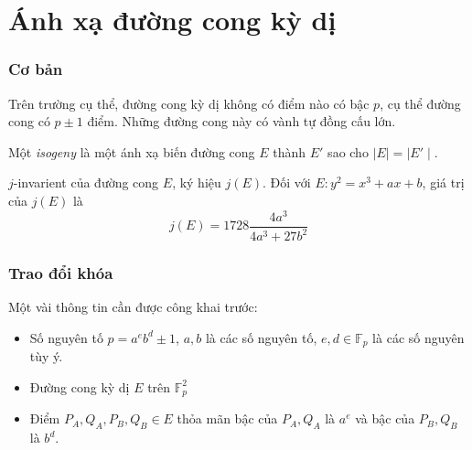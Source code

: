 \documentclass [xcolor=svgnames, t] {beamer}
\theoremstyle{definition}
\begin{document}
\section{Ánh xạ đường cong kỳ dị}

\begin{frame}
    \frametitle{Cơ bản}
    \begin{definition}
        Trên trường cụ thể, đường cong kỳ dị không có điểm nào có bậc $p$, cụ thể đường cong có $p \pm 1$ điểm. Những đường cong này có vành tự đồng cấu lớn.
    \end{definition}
    \begin{definition}
        Một \textit{isogeny} là một ánh xạ biến đường cong $E$ thành $E'$ sao cho $\mid E \mid = \mid E' \mid$.
    \end{definition}
    \begin{definition}
        $j$-invarient của đường cong $E$, ký hiệu $j(E)$. Đối với $E: y^2 = x^3 + ax + b$, giá trị của $j(E)$ là
        $$j(E) = 1728\frac{4a^3}{4a^3+27b^2}$$
    \end{definition}
\end{frame}
\begin{frame}
    \frametitle{Trao đổi khóa}
    Một vài thông tin cần được công khai trước:
    \begin{itemize}
        \item Số nguyên tố $p = a^eb^d \pm 1$, $a, b$ là các số nguyên tố, $e,d \in \mathbb{F}_p$ là các số nguyên tùy ý.
        \item Đường cong kỳ dị $E$ trên $\mathbb{F}_p^2$
        \item Điểm $P_A, Q_A, P_B, Q_B \in E$ thỏa mãn bậc của $P_A, Q_A$ là $a^e$ và bậc của $P_B, Q_B$ là $b^d$.
    \end{itemize}


\end{frame}
\end{document}
